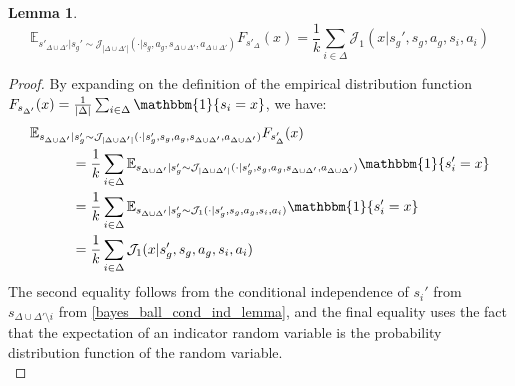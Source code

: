 \documentclass{article}
\theoremstyle{plain}
\newtheorem{lemma}[theorem]{Lemma}
\theoremstyle{definition}
\begin{document}
\begin{lemma}\label{lemma:exp_empirical}
\[\mathbb{E}_{s'_{\Delta\cup\Delta'}|s_g'\sim \mathcal{J}_{|\Delta\cup\Delta'|}(\cdot|s_g,a_g,s_{\Delta\cup\Delta'},a_{\Delta\cup\Delta'})}F_{s'_{\Delta}}(x) = \frac{1}{k}\sum_{i\in\Delta}\mathcal{J}_1(x|s_g',s_g,a_g,s_i,a_i)\]
\end{lemma}
\begin{proof} By expanding on the definition of the empirical distribution function $F_{s_{\Delta'}}(x) = \frac{1}{|\Delta|}\sum_{i\in\Delta}\mathbbm{1}\{s_i=x\}$, we have:
\begin{align*}&\mathbb{E}_{s_{\Delta\cup\Delta'}|s_g'\sim \mathcal{J}_{|\Delta\cup\Delta'|}(\cdot|s_g',s_g,a_g,s_{\Delta\cup\Delta'},a_{\Delta\cup\Delta'})}F_{s'_{\Delta}}(x) \\
&\quad\quad\quad= \frac{1}{k}\sum_{i\in\Delta}\mathbb{E}_{s_{\Delta\cup\Delta'}|s_g'\sim \mathcal{J}_{|\Delta\cup\Delta'|}(\cdot|s_g',s_g,a_g,s_{\Delta\cup\Delta'},a_{\Delta\cup\Delta'})}\mathbbm{1}\{s_i'=x\} \\
&\quad\quad\quad= \frac{1}{k}\sum_{i\in\Delta}\mathbb{E}_{s_{\Delta\cup\Delta'}|s_g'\sim \mathcal{J}_{1}(\cdot|s_g',s_g,a_g,s_{i},a_{i})}\mathbbm{1}\{s_i'=x\} \\
&\quad\quad\quad= \frac{1}{k}\sum_{i\in\Delta}\mathcal{J}_1(x|s_g',s_g,a_g,s_i,a_i)
\end{align*}
The second equality follows from the conditional independence of $s_i'$ from $s_{\Delta\cup\Delta'\setminus i}$ from \cref{bayes_ball_cond_ind_lemma}, and the final equality uses the fact that the expectation of an indicator random variable is the probability distribution function of the random variable. \qedhere \\ \end{proof}
\end{document}
